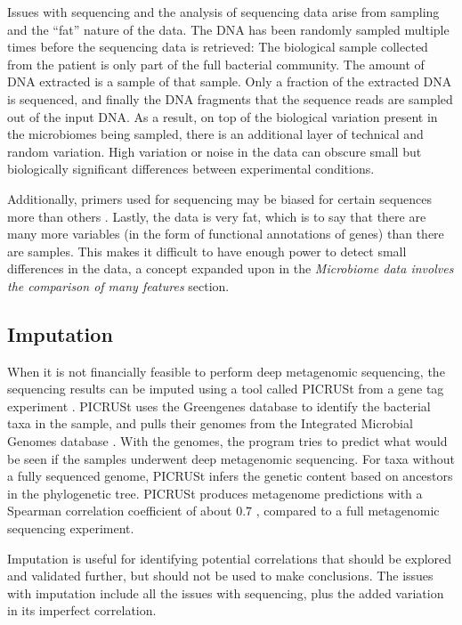 Issues with sequencing and the analysis of sequencing data arise from sampling and the ``fat'' nature of the data. The DNA has been randomly sampled multiple times before the sequencing data is retrieved: The biological sample collected from the patient is only part of the full bacterial community. The amount of DNA extracted is a sample of that sample. Only a fraction of the extracted DNA is sequenced, and finally the DNA fragments that the sequence reads are sampled out of the input DNA. As a result, on top of the biological variation present in the microbiomes being sampled, there is an additional layer of technical and random variation. High variation or noise in the data can obscure small but biologically significant differences between experimental conditions.

Additionally, primers used for sequencing may be biased for certain sequences more than others \cite{kanagawa2003bias}. Lastly, the data is very fat, which is to say that there are many more variables (in the form of functional annotations of genes) than there are samples. This makes it difficult to have enough power to detect small differences in the data, a concept expanded upon in the \textit{Microbiome data involves the comparison of many features} section.

\FloatBarrier

\subsection{Imputation}
When it is not financially feasible to perform deep metagenomic sequencing, the sequencing results can be imputed using a tool called PICRUSt from a gene tag experiment \cite{langille2013predictive}. PICRUSt uses the Greengenes database \cite{desantis2006greengenes} to identify the bacterial taxa in the sample, and pulls their genomes from the Integrated Microbial Genomes database \cite{markowitz2012img}. With the genomes, the program tries to predict what would be seen if the samples underwent deep metagenomic sequencing. For taxa without a fully sequenced genome, PICRUSt infers the genetic content based on ancestors in the phylogenetic tree. PICRUSt produces metagenome predictions with a Spearman correlation coefficient of about $0.7$ \cite{langille2013predictive}, compared to a full metagenomic sequencing experiment.

Imputation is useful for identifying potential correlations that should be explored and validated further, but should not be used to make conclusions. The issues with imputation include all the issues with sequencing, plus the added variation in its imperfect correlation.

